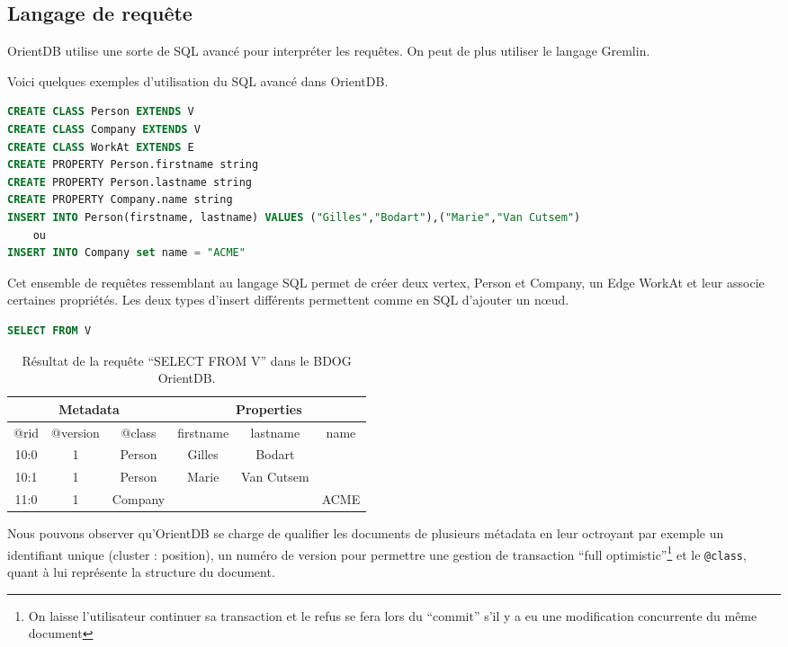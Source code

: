 \documentclass[a4paper,fleqn,12pt,oneside]{report}
\begin{document}
\subsection{Langage de requête}

OrientDB utilise une sorte de SQL avancé pour interpréter les requêtes. On peut de plus utiliser le langage Gremlin.

Voici quelques exemples d'utilisation du SQL avancé dans OrientDB.

\begin{lstlisting}[language=SQL]
CREATE CLASS Person EXTENDS V
CREATE CLASS Company EXTENDS V
CREATE CLASS WorkAt EXTENDS E
CREATE PROPERTY Person.firstname string
CREATE PROPERTY Person.lastname string
CREATE PROPERTY Company.name string
INSERT INTO Person(firstname, lastname) VALUES ("Gilles","Bodart"),("Marie","Van Cutsem")
	ou
INSERT INTO Company set name = "ACME"

\end{lstlisting}

Cet ensemble de requêtes ressemblant au langage SQL permet de créer deux vertex, Person et Company, un Edge WorkAt et leur associe certaines propriétés. Les deux types d’insert différents permettent comme en SQL d’ajouter un nœud.

\begin{lstlisting}[language=SQL]
SELECT FROM V
\end{lstlisting}
\begin{table}
	\centering
	\begin{tabular}{|c|c|c|c|c|c|}
   		\hline
  		\multicolumn{3}{|c|}{Metadata} & \multicolumn{3}{c|}{Properties} \\
   		\hline
   		@rid & @version & @class & firstname & lastname & name \\
   		\hline
   		10:0 & 1 & Person & Gilles & Bodart &  \\
   		10:1 & 1 & Person & Marie & Van Cutsem &  \\
   		11:0 & 1 & Company &  &  & ACME \\
   		\hline
	\end{tabular}
	\caption{Résultat de la requête \enquote{SELECT FROM V} dans le BDOG OrientDB.}
\end{table}

Nous pouvons observer qu'OrientDB se charge de qualifier les documents de plusieurs métadata en leur octroyant par exemple un identifiant unique (\no cluster : position), un numéro de version pour permettre une gestion de transaction \enquote{full optimistic}\footnote{On laisse l'utilisateur continuer sa transaction et le refus se fera lors du \enquote{commit} s'il y a eu une modification concurrente du même document} et le \texttt{@class}, quant à lui représente la structure du document.
\end{document}

